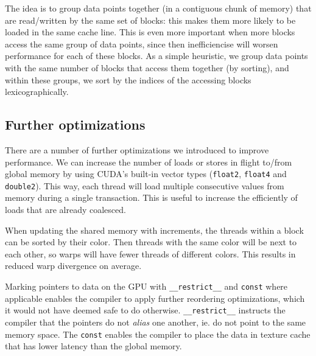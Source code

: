 The idea is to group data points together (in a contiguous chunk of memory) that
are read/written by the same set of blocks: this makes them more likely to be
loaded in the same cache line. This is even more important when more blocks
access the same group of data points, since then inefficiencise will worsen
performance for each of these blocks. As a simple heuristic, we group data
points with the same number of blocks that access them together (by sorting),
and within these groups, we sort by the indices of the accessing blocks
lexicographically.

\subsection{Further optimizations}\label{optimisations}

\noindent There are a number of further optimizations we introduced to improve
performance. We can increase the number of loads or stores in flight 
to/from global memory by using CUDA's built-in vector types 
(\lstinline!float2!, \lstinline!float4! and \lstinline!double2!). This way, 
each thread will load multiple consecutive values from memory during a single 
transaction. This is useful to increase the efficiently of loads that are 
already coalesced.

When updating the shared memory with increments, the threads within a block can 
be sorted by their color. Then threads with the same color will be next to each 
other, so warps will have fewer threads of different colors. This results in 
reduced warp divergence on average.

Marking pointers to data on the GPU with \lstinline!__restrict__! and 
\lstinline!const! where applicable enables the compiler to apply further 
reordering optimizations, which it would not have deemed safe to do otherwise. 
\lstinline!__restrict__! instructs the compiler that the pointers do not 
\emph{alias} one another, ie. do not point to the same memory space. The 
\lstinline!const! enables the compiler to place the data in texture cache that 
has lower latency than the global memory.
